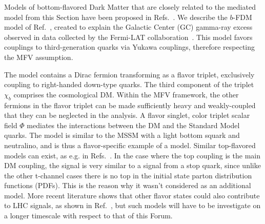 Models of bottom-flavored Dark Matter that are closely related to the \tchannel mediated model from this 
Section have been proposed in Refs.~\cite{Lin:2013sca,Agrawal:2014una}. 
We describe the $b$-FDM model of Ref.~\cite{Agrawal:2014una}, created to explain the Galactic Center (GC) 
gamma-ray excess observed in data collected by the Fermi-LAT collaboration~\cite{Daylan:2014rsa,Calore:2014xka}. 
This model favors couplings to third-generation quarks via Yukawa couplings, 
therefore respecting the MFV assumption. 


The model contains a Dirac fermion transforming as a flavor triplet, exclusively coupling
to right-handed down-type quarks. The third component of the triplet $\chi_b$ comprises the 
cosmological DM. Within the MFV framework, the other fermions in the flavor triplet can be 
made sufficiently heavy and weakly-coupled that they can be neglected in the analysis.
A flavor singlet, color triplet scalar field $\Phi$ mediates the interactions between the DM 
and the Standard Model quarks.  The model is similar to the MSSM with a light bottom squark and neutralino, 
and is thus a flavor-specific example of a \tchannel model. 
Similar top-flavored models can exist, as e.g. in Refs.~\cite{Kumar:2013hfa,Batell:2013zwa}. 
In the case where the top coupling is the main DM coupling, 
the signal is very similar to a signal from a stop quark, since unlike the other t-channel cases there is no top
in the initial state parton distribution functions (PDFs). This is the reason why it wasn't considered as an additional model. More recent
literature shows that other flavor states could also contribute to LHC signals, as shown in Ref.~\cite{Kilic:2015vka},
but such models will have to be investigate on a longer timescale with respect to that of this Forum. 

